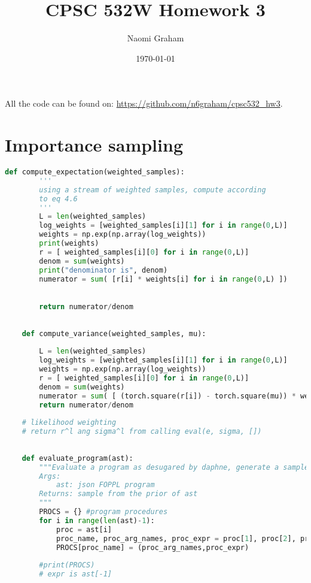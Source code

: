 \documentclass[12pt]{article}%
\theoremstyle{definition}
\begin{document}
	
	\title{CPSC 532W Homework 3}
	\author{Naomi Graham}
	\date{\today}
	\maketitle
	
	All the code can be found on: \url{https://github.com/n6graham/cpsc532_hw3}.
	
	
	\section{Importance sampling}
	
	\begin{lstlisting}[language=Python]
	def compute_expectation(weighted_samples):
	    '''
	    using a stream of weighted samples, compute according
	    to eq 4.6 
	    '''
	    L = len(weighted_samples)
	    log_weights = [weighted_samples[i][1] for i in range(0,L)]
	    weights = np.exp(np.array(log_weights))
	    print(weights)
	    r = [ weighted_samples[i][0] for i in range(0,L)]
	    denom = sum(weights)
	    print("denominator is", denom)
	    numerator = sum( [r[i] * weights[i] for i in range(0,L) ])

	
	    return numerator/denom
	
	
	def compute_variance(weighted_samples, mu):
	
	    L = len(weighted_samples)
	    log_weights = [weighted_samples[i][1] for i in range(0,L)]
	    weights = np.exp(np.array(log_weights))
	    r = [ weighted_samples[i][0] for i in range(0,L)]
	    denom = sum(weights)
	    numerator = sum( [ (torch.square(r[i]) - torch.square(mu)) * weights[i] for i in range(0,L) ])
	    return numerator/denom
	
	# likelihood weighting
	# return r^l ang sigma^l from calling eval(e, sigma, [])
	
	
	def evaluate_program(ast):
	    """Evaluate a program as desugared by daphne, generate a sample from the prior
	    Args:
	        ast: json FOPPL program
	    Returns: sample from the prior of ast
	    """
	    PROCS = {} #program procedures
	    for i in range(len(ast)-1):
	        proc = ast[i]
	        proc_name, proc_arg_names, proc_expr = proc[1], proc[2], proc[3]
	        PROCS[proc_name] = (proc_arg_names,proc_expr)
	
	    #print(PROCS)
	    # expr is ast[-1]
	

\end{lstlisting}
\end{document}
